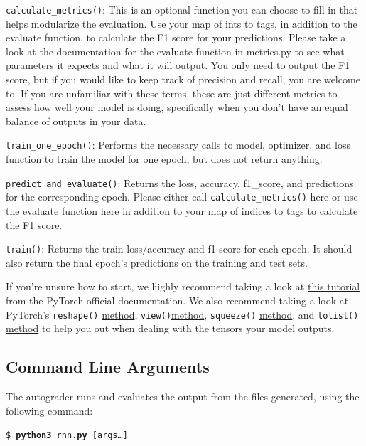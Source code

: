 \documentclass[11pt,addpoints,answers]{exam}
\begin{document}
\texttt{calculate\_metrics()}: This is an optional function you can choose to fill in that helps modularize the evaluation. Use your map of ints to tags, in addition to the evaluate function, to calculate the F1 score for your predictions. Please take a look at the documentation for the evaluate function in metrics.py to see what parameters it expects and what it will output. You only need to output the F1 score, but if you would like to keep track of precision and recall, you are welcome to. If you are unfamiliar with these terms, these are just different metrics to assess how well your model is doing, specifically when you don't have an equal balance of outputs in your data.

\texttt{train\_one\_epoch()}: Performs the necessary calls to model, optimizer, and loss function to train the model for one epoch, but does not return anything. 

\texttt{predict\_and\_evaluate()}: Returns the loss, accuracy, f1\_score, and predictions for the corresponding epoch. Please either call \texttt{calculate\_metrics()} here or use the evaluate function here in addition to your map of indices to tags to calculate the F1 score.

\texttt{train()}: Returns the train loss/accuracy and f1 score for each epoch. It should also return the final epoch's predictions on the training and test sets.

If you're unsure how to start, we highly recommend taking a look at \href{https://pytorch.org/tutorials/beginner/introyt/trainingyt.html}{this tutorial} from the PyTorch official documentation. We also recommend taking a look at PyTorch's \texttt{reshape()} \href{https://pytorch.org/docs/stable/generated/torch.reshape.html}{method}, \texttt{view()}\href{https://pytorch.org/docs/stable/generated/torch.Tensor.view.html}{method}, \texttt{squeeze()} \href{https://pytorch.org/docs/stable/generated/torch.squeeze.html}{method}, and \texttt{tolist()} \href{https://pytorch.org/docs/stable/generated/torch.Tensor.tolist.html}{method} to help you out when dealing with the tensors your model outputs.


\subsection{Command Line Arguments}\label{command}
The autograder runs and evaluates the output from the files generated, using the following command:

\begin{tabbing}
\=\texttt{\$ \textbf{python3} rnn.\textbf{py} [args\dots]}\\
\end{tabbing}
    
\end{document}
